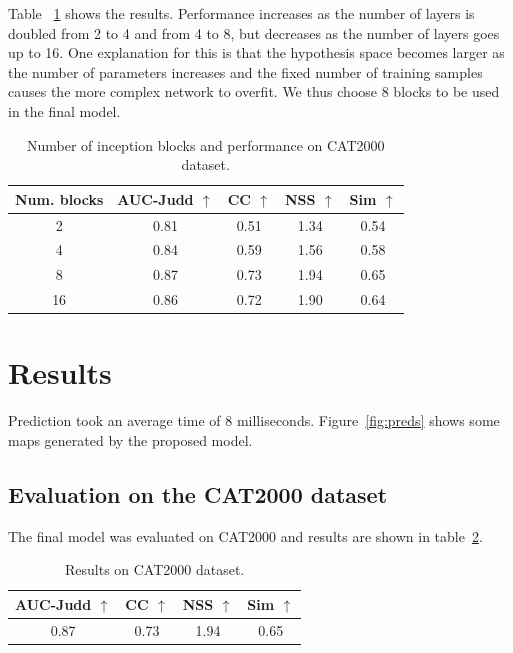 \documentclass[conference]{IEEEtran}
\begin{document}
Table ~\ref{table:nlayers} shows the results.
Performance increases as the number of layers is doubled from 2 to 4
and from 4 to 8, but decreases as the number of layers goes up to 16.
One explanation for this is that the hypothesis space becomes larger
as the number of parameters increases and the fixed number of training
samples causes the more complex network to overfit.
We thus choose 8 blocks to be used in the final model.

\begin{table}
	\small
    \begin{center}
    \caption{Number of inception blocks and performance on CAT2000 dataset.}
    \label{table:nlayers}
    \begin{tabular}{|c|c|c|c|c|}
        \hline
        Num. blocks
            & AUC-Judd $\uparrow$ & CC $\uparrow$
            & NSS $\uparrow$ & Sim $\uparrow$\\
        \hline
        2 & 0.81 & 0.51 & 1.34 & 0.54\\
        \hline
        4 & 0.84 & 0.59 & 1.56 & 0.58\\
        \hline
        8 & 0.87 & 0.73 & 1.94 & 0.65\\
        \hline
        16 & 0.86 & 0.72 & 1.90 & 0.64\\
        \hline
    \end{tabular}
    \end{center}
\end{table}

\section{Results}
Prediction took an average time of 8 milliseconds.
Figure~\ref{fig:preds} shows some maps generated by the proposed model.

\subsection{Evaluation on the CAT2000 dataset}
The final model was evaluated on CAT2000 and results are shown
in table~\ref{table:cat200eval}.

\begin{table}
	\small
    \begin{center}
    \caption{Results on CAT2000 dataset.}
    \label{table:cat200eval}
    \begin{tabular}{|c|c|c|c|}
        \hline
            AUC-Judd $\uparrow$ & CC $\uparrow$
            & NSS $\uparrow$ & Sim $\uparrow$\\
        \hline
        0.87 & 0.73 & 1.94 & 0.65\\
        \hline
    \end{tabular}
    \end{center}
\end{table}
\end{document}
